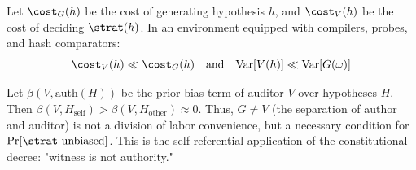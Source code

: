 \begin{thm}
Let $\cost_G(h)$ be the cost of generating hypothesis $h$, and $\cost_V(h)$ be the cost of deciding $\strat(h)$. In an environment equipped with compilers, probes, and hash comparators:
\[
\cost_V(h) \ll \cost_G(h) \quad \text{and} \quad
\mathrm{Var}[V(h)] \ll \mathrm{Var}[G(\omega)]
\]
\end{thm}

\begin{lem}
Let $\beta(V, \mathrm{auth}(H))$ be the prior bias term of auditor $V$ over hypotheses $H$. Then $\beta(V, H_{\text{self}}) > \beta(V, H_{\text{other}}) \approx 0$. Thus, $G \ne V$ (the separation of author and auditor) is not a division of labor convenience, but a necessary condition for $\Pr[\strat \text{ unbiased}]$. This is the self-referential application of the constitutional decree: "witness is not authority."
\end{lem}
